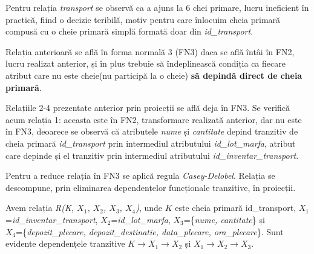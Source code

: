 \documentclass[12pt, a4paper]{article}
\begin{document}
\begin{table}[!htbp]
\begin{center}
\caption{Proiectia \emph{R4($K_4$, $Z$)}}\label{tab10-4}
\end{center}
\end{table}

Pentru relația \emph{transport} se observă ca a ajuns la 6 chei primare, lucru ineficient în practică, fiind o decizie teribilă, motiv pentru care înlocuim cheia primară compusă cu o cheie primară simplă formată doar din \emph{id\_transport}.

Relația anterioară se află în forma normală 3 (FN3) daca se află întâi în FN2, lucru realizat anterior, și în plus trebuie să îndeplinească condiția ca fiecare atribut care nu este cheie(nu participă la o cheie) \textbf{să depindă direct de cheia primară}.

Relațiile 2-4 prezentate anterior prin proiecții se află deja în FN3. Se verifică acum relația 1: aceasta este în FN2, transformare realizată anterior, dar nu este în FN3, deoarece se observă că atributele \emph{nume} și \emph{cantitate} depind tranzitiv de cheia primară \emph{id\_transport} prin intermediul atributului \emph{id\_lot\_marfa}, atribut care depinde și el tranzitiv prin intermediul atributului \emph{id\_inventar\_transport}.

Pentru a reduce relația în FN3 se aplică regula \emph{Casey-Delobel}. Relația se descompune, prin eliminarea dependențelor funcționale tranzitive, în proiecții.

Avem relația \emph{R(K, $X_1$, $X_2$, $X_3$, $X_4$)}, unde $K$ este cheia primară id\_transport, $X_1$=\emph{id\_inventar\_transport}, $X_2$=\emph{id\_lot\_marfa}, $X_3$=\{\emph{nume, cantitate}\} și\\ $X_4$=\{\emph{depozit\_plecare, depozit\_destinatie, data\_plecare, ora\_plecare}\}. Sunt \\evidente dependențele tranzitive $K\rightarrow X_1\rightarrow X_2$ și $X_1\rightarrow X_2\rightarrow X_3$.
\end{document}
